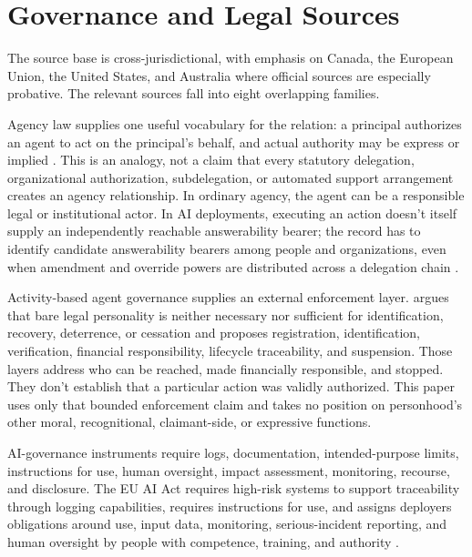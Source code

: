 \section{Governance and Legal Sources}
\label{sec:governance-law}

The source base is cross-jurisdictional, with emphasis on Canada, the European Union, the United States, and Australia where official sources are especially probative. The relevant sources fall into eight overlapping families.

Agency law supplies one useful vocabulary for the relation: a principal authorizes an agent to act on the principal's behalf, and actual authority may be express or implied \citep{cornellWexAgency,cornellWexActualAuthority}. This is an analogy, not a claim that every statutory delegation, organizational authorization, subdelegation, or automated support arrangement creates an agency relationship. In ordinary agency, the agent can be a responsible legal or institutional actor. In AI deployments, executing an action doesn't itself supply an independently reachable answerability bearer; the record has to identify candidate answerability bearers among people and organizations, even when amendment and override powers are distributed across a delegation chain \citep{cornellWexPrincipal}.

Activity-based agent governance supplies an external enforcement layer. \textcite{rajagopalan2026governingAgenticAI} argues that bare legal personality is neither necessary nor sufficient for identification, recovery, deterrence, or cessation and proposes registration, identification, verification, financial responsibility, lifecycle traceability, and suspension. Those layers address who can be reached, made financially responsible, and stopped. They don't establish that a particular action was validly authorized. This paper uses only that bounded enforcement claim and takes no position on personhood's other moral, recognitional, claimant-side, or expressive functions.

AI-governance instruments require logs, documentation, intended-purpose limits, instructions for use, human oversight, impact assessment, monitoring, recourse, and disclosure. The EU AI Act requires high-risk systems to support traceability through logging capabilities, requires instructions for use, and assigns deployers obligations around use, input data, monitoring, serious-incident reporting, and human oversight by people with competence, training, and authority \citep{europeanUnion2024aiAct}.

